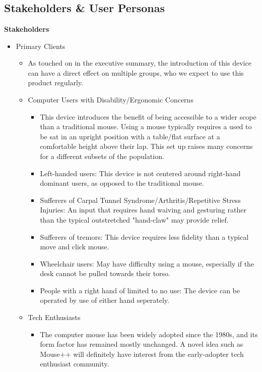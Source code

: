 \documentclass{article}
\newcommand{\partsection}{%
    \section[Part \Roman{section}]{}
}
\begin{document}
\partsection{}

\subsection{Stakeholders \& User Personas}

\textbf{Stakeholders}
  

\begin{itemize}
  \item Primary Clients
    \begin{itemize}
      \item As touched on in the executive summary, the introduction of this device can have a direct effect on multiple groups, who we expect to use this product regularly.
      
      \item Computer Users with Disability/Ergonomic Concerns
        \begin{itemize}
          \item This device introduces the benefit of being accessible to a wider scope than a traditional mouse. Using a mouse typically requires a used to be sat in an upright position with a table/flat surface at a comfortable height above their lap. This set up raises many concerns for a different subsets of the population.
            \item Left-handed users: This device is not centered around right-hand dominant users, as opposed to the traditional mouse.
            \item Sufferers of Carpal Tunnel Syndrome/Arthritis/Repetitive Stress Injuries: An input that requires hand waiving and gesturing rather than the typical outstretched "hand-claw" may provide relief.
            \item Sufferers of tremors: This device requires less fidelity than a typical move and click mouse.
            \item Wheelchair users: May have difficulty using a mouse, especially if the desk cannot be pulled towards their torso.
            \item People with a right hand of limited to no use: The device can be operated by use of either hand seperately.
        \end{itemize}
      \item Tech Enthusiasts
        \begin{itemize}
          \item The computer mouse has been widely adopted since the 1980s, and its form factor has remained mostly unchanged. A novel idea such as Mouse++ will definitely have interest from the early-adopter tech enthusiast community.

\end{itemize}
\end{itemize}
\end{itemize}
\end{document}
